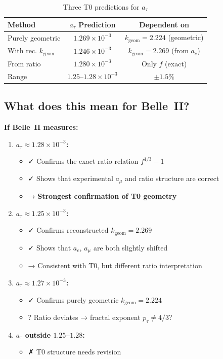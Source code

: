 	\begin{table}[h]
		\centering
		\begin{tabular}{lcc}
			\toprule
			\textbf{Method} & \textbf{$a_\tau$ Prediction} & \textbf{Dependent on} \\
			\midrule
			Purely geometric & $1.269 \times 10^{-3}$ & $k_{\text{geom}} = 2.224$ (geometric) \\
			With rec. $k_{\text{geom}}$ & $1.246 \times 10^{-3}$ & $k_{\text{geom}} = 2.269$ (from $a_e$) \\
			From ratio & $1.280 \times 10^{-3}$ & Only $f$ (exact) \\
			\midrule
			Range & $1.25$--$1.28 \times 10^{-3}$ & $\pm 1.5\%$ \\
			\bottomrule
		\end{tabular}
		\caption{Three T0 predictions for $a_\tau$}
	\end{table}
	
	\subsection{What does this mean for Belle~II?}
	
	\textbf{If Belle~II measures:}
	
	\begin{enumerate}
		\item \textbf{$a_\tau \approx 1.28 \times 10^{-3}$:}
		\begin{itemize}
			\item ✓ Confirms the exact ratio relation $f^{1/3} - 1$
			\item ✓ Shows that experimental $a_\mu$ and ratio structure are correct
			\item → \textbf{Strongest confirmation of T0 geometry}
		\end{itemize}
		
		\item \textbf{$a_\tau \approx 1.25 \times 10^{-3}$:}
		\begin{itemize}
			\item ✓ Confirms reconstructed $k_{\text{geom}} = 2.269$
			\item ✓ Shows that $a_e$, $a_\mu$ are both slightly shifted
			\item → Consistent with T0, but different ratio interpretation
		\end{itemize}
		
		\item \textbf{$a_\tau \approx 1.27 \times 10^{-3}$:}
		\begin{itemize}
			\item ✓ Confirms purely geometric $k_{\text{geom}} = 2.224$
			\item ? Ratio deviates → fractal exponent $p_\tau \neq 4/3$?
		\end{itemize}
		
		\item \textbf{$a_\tau$ outside $1.25$--$1.28$:}
		\begin{itemize}
			\item ✗ T0 structure needs revision
		\end{itemize}
	\end{enumerate}
	
